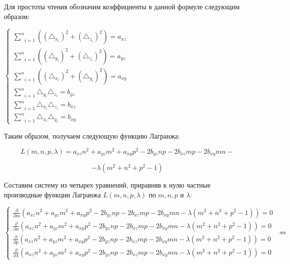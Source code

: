 \documentclass[article,final,14pt]{scrreprt}
\begin{document}
Для простоты чтения обозначим коэффициенты в данной формуле следующим образом:

\begin{center}
	$\begin{cases}
		\underset{i=1}{\overset{n}{\sum}} \left((\triangle_{x_i})^2 + (\triangle_{z_i})^2\right) = a_{xz} \\
		\underset{i=1}{\overset{n}{\sum}} \left((\triangle_{y_i})^2 + (\triangle_{z_i})^2\right) = a_{yz} \\
		\underset{i=1}{\overset{n}{\sum}}\left((\triangle_{x_i})^2 + (\triangle_{y_i})^2\right) = a_{xy} \\
		\underset{i=1}{\overset{n}{\sum}} \triangle_{y_i} \triangle_{z_i} = b_{yz} \\
		\underset{i=1}{\overset{n}{\sum}} \triangle_{x_i} \triangle_{z_i} = b_{xz} \\
		\underset{i=1}{\overset{n}{\sum}} \triangle_{x_i} \triangle_{y_i} = b_{xy}
	\end{cases}$
\end{center}

Таким образом, получаем следующую функцию Лагранжа:

$$L(m, n, p, \lambda) = a_{xz} n^2 + a_{yz} m^2 + a_{xy} p^2 - 2 b_{yz} n p - 2 b_{xz} m p  - 2 b_{xy} m n - $$

$$ - \lambda (m^2 + n^2 + p^2-1)$$

Составим систему из четырех уравнений, приравняв к нулю частные производные функции Лагранжа $L(m, n, p, \lambda)$ по $m, n, p$ и $\lambda$:

\begin{center}
	$\begin{cases}
		\frac{\partial}{\partial m} \left(a_{xz} n^2 + a_{yz} m^2 + a_{xy} p^2 - 2 b_{yz} n p - 2 b_{xz} m p  - 2 b_{xy} m n - \lambda (m^2 + n^2 + p^2-1)\right) = 0 \\
		\frac{\partial}{\partial n} \left(a_{xz} n^2 + a_{yz} m^2 + a_{xy} p^2 - 2 b_{yz} n p - 2 b_{xz} m p  - 2 b_{xy} m n - \lambda (m^2 + n^2 + p^2-1)\right) = 0 \\
		\frac{\partial}{\partial p} \left(a_{xz} n^2 + a_{yz} m^2 + a_{xy} p^2 - 2 b_{yz} n p - 2 b_{xz} m p  - 2 b_{xy} m n - \lambda (m^2 + n^2 + p^2-1)\right) = 0 \\
		\frac{\partial}{\partial \lambda} \left(a_{xz} n^2 + a_{yz} m^2 + a_{xy} p^2 - 2 b_{yz} n p - 2 b_{xz} m p  - 2 b_{xy} m n - \lambda (m^2 + n^2 + p^2-1)\right) = 0
	\end{cases} \; \Leftrightarrow \;$
\end{center}
\end{document}
